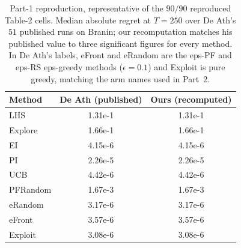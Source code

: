 \begin{table}[t]
\centering
\caption{Part-1 reproduction, representative of the $90/90$ reproduced Table-2 cells. Median absolute regret at $T=250$ over De Ath's $51$ published runs on Branin; our recomputation matches his published value to three significant figures for every method. In De Ath's labels, eFront and eRandom are the eps-PF and eps-RS eps-greedy methods ($\epsilon=0.1$) and Exploit is pure greedy, matching the arm names used in Part~2.}
\label{tab:repro}
\small
\begin{tabular}{lcc}
\toprule
Method & De Ath (published) & Ours (recomputed) \\
\midrule
LHS      & 1.31e-1 & 1.31e-1 \\
Explore  & 1.66e-1 & 1.66e-1 \\
EI       & 4.15e-6 & 4.15e-6 \\
PI       & 2.26e-5 & 2.26e-5 \\
UCB      & 4.42e-6 & 4.42e-6 \\
PFRandom & 1.67e-3 & 1.67e-3 \\
eRandom  & 3.17e-6 & 3.17e-6 \\
eFront   & 3.57e-6 & 3.57e-6 \\
Exploit  & 3.08e-6 & 3.08e-6 \\
\bottomrule
\end{tabular}
\end{table}
